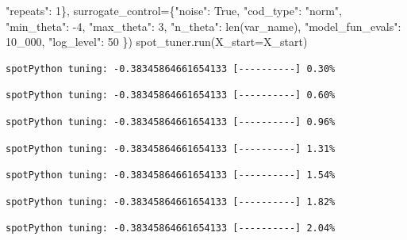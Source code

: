 \documentclass[
  letterpaper,
  DIV=11,
  numbers=noendperiod]{scrreprt}
\newenvironment{Shaded}{\begin{snugshade}}{\end{snugshade}}
\newcommand{\BuiltInTok}[1]{\textcolor[rgb]{0.00,0.23,0.31}{#1}}
\newcommand{\DecValTok}[1]{\textcolor[rgb]{0.68,0.00,0.00}{#1}}
\newcommand{\NormalTok}[1]{\textcolor[rgb]{0.00,0.23,0.31}{#1}}
\newcommand{\OperatorTok}[1]{\textcolor[rgb]{0.37,0.37,0.37}{#1}}
\newcommand{\StringTok}[1]{\textcolor[rgb]{0.13,0.47,0.30}{#1}}
\newcommand{\VariableTok}[1]{\textcolor[rgb]{0.07,0.07,0.07}{#1}}
\begin{document}
\begin{Shaded}
\begin{Highlighting}[]
                                   \StringTok{"repeats"}\NormalTok{: }\DecValTok{1}\NormalTok{\},}
\NormalTok{                   surrogate\_control}\OperatorTok{=}\NormalTok{\{}\StringTok{"noise"}\NormalTok{: }\VariableTok{True}\NormalTok{,}
                                      \StringTok{"cod\_type"}\NormalTok{: }\StringTok{"norm"}\NormalTok{,}
                                      \StringTok{"min\_theta"}\NormalTok{: }\OperatorTok{{-}}\DecValTok{4}\NormalTok{,}
                                      \StringTok{"max\_theta"}\NormalTok{: }\DecValTok{3}\NormalTok{,}
                                      \StringTok{"n\_theta"}\NormalTok{: }\BuiltInTok{len}\NormalTok{(var\_name),}
                                      \StringTok{"model\_fun\_evals"}\NormalTok{: }\DecValTok{10\_000}\NormalTok{,}
                                      \StringTok{"log\_level"}\NormalTok{: }\DecValTok{50}
\NormalTok{                                      \})}
\NormalTok{spot\_tuner.run(X\_start}\OperatorTok{=}\NormalTok{X\_start)}
\end{Highlighting}
\end{Shaded}

\begin{verbatim}
spotPython tuning: -0.38345864661654133 [----------] 0.30% 
\end{verbatim}

\begin{verbatim}
spotPython tuning: -0.38345864661654133 [----------] 0.60% 
\end{verbatim}

\begin{verbatim}
spotPython tuning: -0.38345864661654133 [----------] 0.96% 
\end{verbatim}

\begin{verbatim}
spotPython tuning: -0.38345864661654133 [----------] 1.31% 
\end{verbatim}

\begin{verbatim}
spotPython tuning: -0.38345864661654133 [----------] 1.54% 
\end{verbatim}

\begin{verbatim}
spotPython tuning: -0.38345864661654133 [----------] 1.82% 
\end{verbatim}

\begin{verbatim}
spotPython tuning: -0.38345864661654133 [----------] 2.04% 
\end{verbatim}
\end{document}
